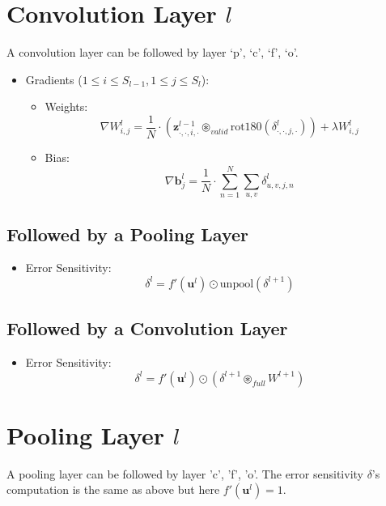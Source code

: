 \documentclass[11pt]{article}
\begin{document}
\section{Convolution Layer \(l\)}
\label{sec-5}
A convolution layer can be followed by layer `p', `c', `f', `o'.
\begin{itemize}
\item Gradients (\(1 \leq i \leq S_{l-1}, 1 \leq j \leq S_{l}\)):
\begin{itemize}
\item Weights:
\[ \nabla W^{l}_{i,j} = \frac{1}{N} \cdot (\mathbf{z}_{\cdot,\cdot,i,\cdot}^{l-1} \circledast_{valid} \mathrm{rot180}(\delta_{\cdot,\cdot,j,\cdot}^{l})) + \lambda W^{l}_{i,j}\]
\item Bias: 
\[ \nabla \mathbf{b}^{l}_{j} = \frac{1}{N} \cdot \sum_{n=1}^{N} \sum_{u,v} \delta^{l}_{u,v,j,n} \]
\end{itemize}
\end{itemize}
\subsection{Followed by a Pooling Layer}
\label{sec-5-1}
\begin{itemize}
\item Error Sensitivity: \[ \delta^{l} = f'(\mathbf{u}^{l}) \odot \mathrm{unpool}(\delta^{l+1}) \]
\end{itemize}
\subsection{Followed by a Convolution Layer}
\label{sec-5-2}
\begin{itemize}
\item Error Sensitivity: \[ \delta^{l} = f'(\mathbf{u}^{l}) \odot (\delta^{l+1} \circledast_{full} W^{l+1}) \]
\end{itemize}

\section{Pooling Layer \(l\)}
\label{sec-6}
A pooling layer can be followed by layer 'c', 'f', 'o'. The error sensitivity \(\delta\)'s computation is the same as above but here \(f'(\mathbf{u}^{l}) = 1\).
\end{document}
